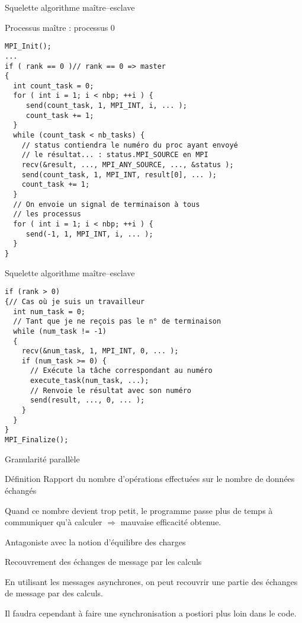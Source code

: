 \documentclass[handout]{beamer}
\begin{document}
\begin{frame}[fragile]{Squelette algorithme maître--esclave}

Processus maître : processus 0

\begin{lstlisting}
MPI_Init();
...
if ( rank == 0 )// rank == 0 => master
{
  int count_task = 0;
  for ( int i = 1; i < nbp; ++i ) {
     send(count_task, 1, MPI_INT, i, ... );     
     count_task += 1;
  }
  while (count_task < nb_tasks) {
    // status contiendra le numéro du proc ayant envoyé
    // le résultat... : status.MPI_SOURCE en MPI
    recv(&result, ..., MPI_ANY_SOURCE, ..., &status );
    send(count_task, 1, MPI_INT, result[0], ... );     
    count_task += 1;    
  }
  // On envoie un signal de terminaison à tous
  // les processus
  for ( int i = 1; i < nbp; ++i ) {
     send(-1, 1, MPI_INT, i, ... );     
  }  
}
\end{lstlisting}
\end{frame}

\begin{frame}[fragile]{Squelette algorithme maître--esclave}

\begin{lstlisting}
if (rank > 0)
{// Cas où je suis un travailleur
  int num_task = 0;
  // Tant que je ne reçois pas le n° de terminaison
  while (num_task != -1)
  {
    recv(&num_task, 1, MPI_INT, 0, ... );
    if (num_task >= 0) {
      // Exécute la tâche correspondant au numéro
      execute_task(num_task, ...);
      // Renvoie le résultat avec son numéro 
      send(result, ..., 0, ... );
    }
  }
}
MPI_Finalize();
\end{lstlisting}
\end{frame}

\begin{frame}[fragile]{Granularité parallèle}


\begin{block}{Définition}
Rapport du nombre d'opérations effectuées sur le nombre de données
échangés
\end{block}

Quand ce nombre devient trop petit, le programme passe plus de temps à
communiquer qu'à calculer $\Rightarrow$ mauvaise efficacité obtenue.

Antagoniste avec la notion d'équilibre des charges
\end{frame}

\begin{frame}[fragile]{Recouvrement des échanges de message par les calculs}

En utilisant les messages asynchrones, on peut recouvrir une partie des
échanges de message par des calculs.

Il faudra cependant à faire une synchronisation a postiori plus loin dans
le code.

\end{frame}
\end{document}
